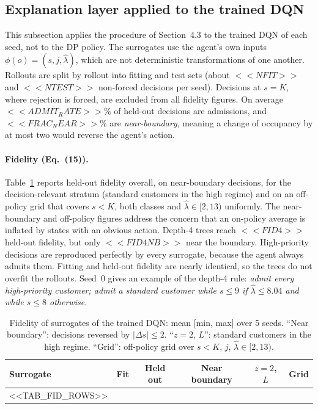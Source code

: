 \subsection{Explanation layer applied to the trained DQN}\label{sec:num-explain}

This subsection applies the procedure of Section~4.3 to the trained DQN of each seed, not to the DP policy. The surrogates use the agent's own inputs $\phi(o)=(s,j,\hat\lambda)$, which are not deterministic transformations of one another. Rollouts are split by rollout into fitting and test sets (about $<<NFIT>>$ and $<<NTEST>>$ non-forced decisions per seed). Decisions at $s=K$, where rejection is forced, are excluded from all fidelity figures. On average $<<ADMIT_RATE>>$\% of held-out decisions are admissions, and $<<FRAC_NEAR>>$\% are \emph{near-boundary}, meaning a change of occupancy by at most two would reverse the agent's action.

\paragraph{Fidelity (Eq.~(15)).} Table~\ref{tab:fid} reports held-out fidelity overall, on near-boundary decisions, for the decision-relevant stratum (standard customers in the high regime) and on an off-policy grid that covers $s<K$, both classes and $\hat\lambda\in[2,13)$ uniformly. The near-boundary and off-policy figures address the concern that an on-policy average is inflated by states with an obvious action. Depth-4 trees reach $<<FID4>>$ held-out fidelity, but only $<<FID4NB>>$ near the boundary. High-priority decisions are reproduced perfectly by every surrogate, because the agent always admits them. Fitting and held-out fidelity are nearly identical, so the trees do not overfit the rollouts. Seed~0 gives an example of the depth-4 rule: \emph{admit every high-priority customer; admit a standard customer while $s\le9$ if $\hat\lambda\le8.04$ and while $s\le8$ otherwise.}

\begin{table}[t]
\centering\small
\caption{Fidelity of surrogates of the trained DQN: mean [min, max] over 5 seeds. ``Near boundary'': decisions reversed by $|\Delta s|\le2$. ``$z{=}2$, $L$'': standard customers in the high regime. ``Grid'': off-policy grid over $s<K$, $j$, $\hat\lambda\in[2,13)$.}\label{tab:fid}
\begin{tabular}{@{}l c c c c c@{}}
\toprule
Surrogate & Fit & Held out & Near boundary & $z{=}2$, $L$ & Grid\\
\midrule
<<TAB_FID_ROWS>>
\bottomrule
\end{tabular}
\end{table}

